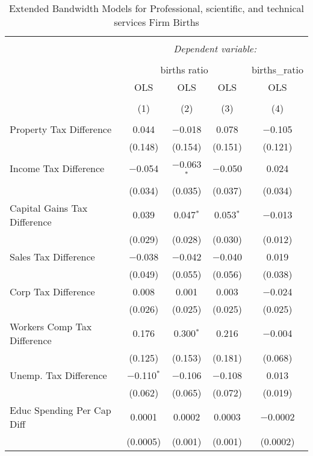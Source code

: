 
\begin{table}[!htbp] \centering 
  \caption{Extended Bandwidth Models for  Professional, scientific, and technical services Firm Births} 
  \label{54eb} 
\begin{tabular}{@{\extracolsep{5pt}}lcccc} 
\\[-1.8ex]\hline 
\hline \\[-1.8ex] 
 & \multicolumn{4}{c}{\textit{Dependent variable:}} \\ 
\cline{2-5} 
\\[-1.8ex] & \multicolumn{3}{c}{births ratio} & births\_ratio \\ 
 & OLS & OLS & OLS & OLS \\ 
\\[-1.8ex] & (1) & (2) & (3) & (4)\\ 
\hline \\[-1.8ex] 
 Property Tax Difference & 0.044 & $-$0.018 & 0.078 & $-$0.105 \\ 
  & (0.148) & (0.154) & (0.151) & (0.121) \\ 
  Income Tax Difference & $-$0.054 & $-$0.063$^{*}$ & $-$0.050 & 0.024 \\ 
  & (0.034) & (0.035) & (0.037) & (0.034) \\ 
  Capital Gains Tax Difference & 0.039 & 0.047$^{*}$ & 0.053$^{*}$ & $-$0.013 \\ 
  & (0.029) & (0.028) & (0.030) & (0.012) \\ 
  Sales Tax Difference & $-$0.038 & $-$0.042 & $-$0.040 & 0.019 \\ 
  & (0.049) & (0.055) & (0.056) & (0.038) \\ 
  Corp Tax Difference & 0.008 & 0.001 & 0.003 & $-$0.024 \\ 
  & (0.026) & (0.025) & (0.025) & (0.025) \\ 
  Workers Comp Tax Difference & 0.176 & 0.300$^{*}$ & 0.216 & $-$0.004 \\ 
  & (0.125) & (0.153) & (0.181) & (0.068) \\ 
  Unemp. Tax Difference & $-$0.110$^{*}$ & $-$0.106 & $-$0.108 & 0.013 \\ 
  & (0.062) & (0.065) & (0.072) & (0.019) \\ 
  Educ Spending Per Cap Diff & 0.0001 & 0.0002 & 0.0003 & $-$0.0002 \\ 
  & (0.0005) & (0.001) & (0.001) & (0.0002) \\ 

\end{tabular}
\end{table}
